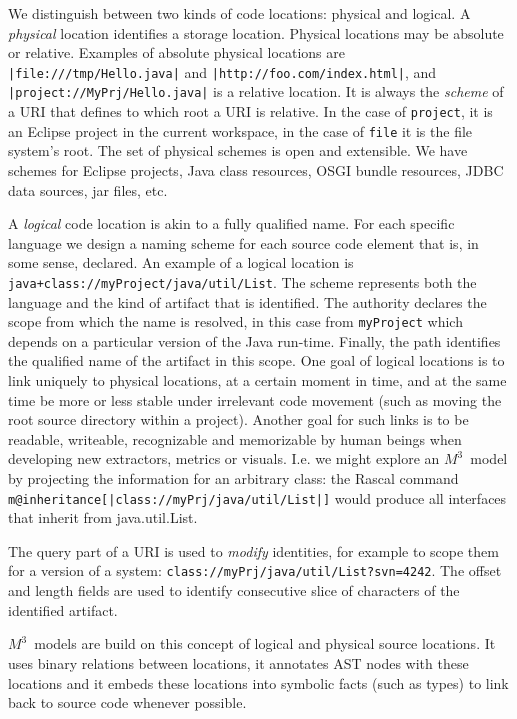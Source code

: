 \documentclass[conference]{IEEEtran}
\newcommand{\loc}[1]{\small{\texttt{#1}}\xspace}
\newcommand{\mthree}{\ensuremath{M^3}\xspace}
\begin{document}
We distinguish between two kinds of code locations: physical and logical. A
\emph{physical} location identifies a storage location. Physical locations may
be absolute or relative. Examples of absolute physical locations are
\loc{|file:///tmp/Hello.java|} and \loc{|http://foo.com/index.html|}, and
\loc{|project://MyPrj/Hello.java|} is a relative location. It is always the
\emph{scheme} of a URI that defines to which root a URI is relative. In the
case of \texttt{project}, it is an Eclipse project in the current workspace,
in the case of \texttt{file} it is the file system's root. The set of
physical schemes is open and extensible. We have schemes for Eclipse projects,
Java class resources, OSGI bundle resources, JDBC data sources, jar files,
etc.

A \emph{logical} code location is akin to a fully qualified name. For each
specific language we design a naming scheme for each source code element that
is, in some sense, declared. An example of a logical location is
\loc{java+class://myProject/java/util/List}. The scheme represents both the
language and the kind of artifact that is identified. The authority declares
the scope from which the name is resolved, in this case from
\texttt{myProject} which depends on a particular version of the Java run-time.
Finally, the path identifies the qualified name of the artifact in this scope.
One goal of logical locations is to link uniquely to physical locations, at a
certain moment in time, and at the same time be more or less stable under
irrelevant code movement (such as moving the root source directory within a
project). Another goal for such links is to be readable, writeable,
recognizable and memorizable by human beings when developing new extractors,
metrics or visuals. I.e. we might explore an \mthree\ model by projecting the
information for an arbitrary class: the Rascal command
\texttt{m@inheritance[|class://myPrj/java/util/List|]} would produce all
interfaces that inherit from java.util.List.

The query part of a URI is used to \emph{modify} identities, for example to
scope them for a version of a system:
\loc{class://myPrj/java/util/List?svn=4242}. The offset and length fields are
used to identify consecutive slice of characters of the identified artifact.

\mthree\ models are build on this concept of logical and physical source
locations. It uses binary relations between locations, it annotates AST nodes
with these locations and it embeds these locations into symbolic facts (such
as types) to link back to source code whenever possible.
\end{document}
